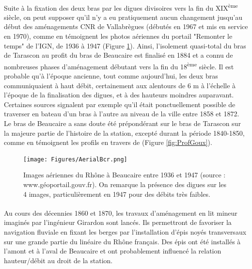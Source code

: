 \documentclass[11pt]{article}
\begin{document}
\FloatBarrier
        \paragraph{} Suite à la fixation des deux bras par les digues divisoires vers la fin du XIX\textsuperscript{ème} siècle, on peut supposer qu'il n'y a eu pratiquement aucun changement jusqu'au début des aménagements CNR de Vallabrègues (débutés en 1967 et mis en service en 1970), comme en témoignent les photos aériennes du portail "Remonter le temps" de l'IGN, de 1936 à 1947 (Figure \ref{fig:AerialBcr}). Ainsi, l'isolement quasi-total du bras de Tarascon au profit du bras de Beaucaire est finalisé en 1884 et a connu de nombreuses phases d'aménagement débutant vers la fin du 18\textsuperscript{ème} siècle. Il est probable qu'à l'époque ancienne, tout comme aujourd'hui, les deux bras communiquaient à haut débit, certainement aux alentours de 6 m à l'échelle à l'époque de la finalisation des digues, et à des hauteurs moindres auparavant. Certaines sources signalent par exemple qu'il était ponctuellement possible de traverser en bateau d'un bras à l'autre au niveau de la ville entre 1858 et 1872. Le bras de Beaucaire a sans doute été prépondérant sur le bras de Tarascon sur la majeure partie de l'histoire de la station, excepté durant la période 1840-1850, comme en témoignent les profils en travers de \citet{goux_modification_1851} (Figure \ref{fig:ProfGoux}).
    
        \begin{figure}[h]
            \centering
        	\texttt{[image: Figures/AerialBcr.png]}
            \caption{Images aériennes du Rhône à Beaucaire entre 1936 et 1947 (source : www.géoportail.gouv.fr). On remarque la présence des digues sur les 4 images, particulièrement en 1947 pour des débits très faibles.}
            \label{fig:AerialBcr}
        \end{figure}
    
		\paragraph{} Au cours des décennies 1860 et 1870, les travaux d'aménagement en lit mineur imaginés par l'ingénieur Girardon sont lancés. Ils permettront de favoriser la navigation fluviale en fixant les berges par l'installation d'épis noyés transversaux sur une grande partie du linéaire du Rhône français. Des épis ont été installés à l'amont et à l'aval de Beaucaire et ont probablement influencé la relation hauteur/débit au droit de la station.
    
\end{document}
